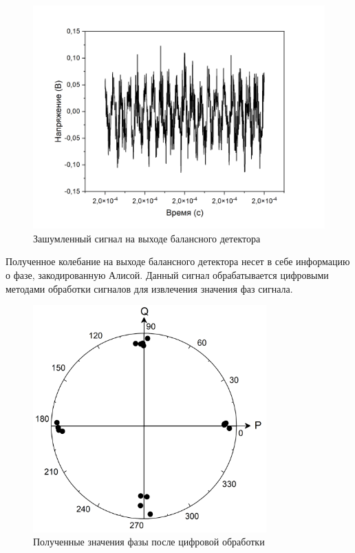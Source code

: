 \begin{figure}
    \centering
    \includegraphics[width=\textwidth]{images/03.png}
    \caption{Зашумленный сигнал на выходе балансного детектора}
    \label{fig:noisy output inject}
\end{figure}
Полученное колебание на выходе балансного детектора несет в себе информацию о фазе, закодированную Алисой. Данный сигнал обрабатывается цифровыми методами обработки сигналов для извлечения значения фаз сигнала. 
\begin{figure}
    \centering
    \includegraphics[width=0.8\textwidth]{images/06.png}
    \caption{Полученные значения фазы после цифровой обработки}
    \label{fig:phase meas ijnect}
\end{figure}

